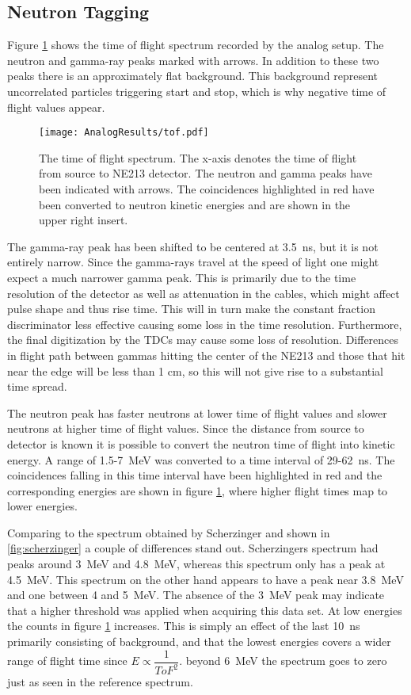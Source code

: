 \documentclass[main.tex]{subfiles}
\begin{document}
\subsection{Neutron Tagging}
Figure \ref{fig:tof_a} shows the time of flight spectrum recorded by the analog setup. The neutron and gamma-ray peaks marked with arrows. In addition to these two peaks there is an approximately flat background. This background represent uncorrelated particles triggering start and stop, which is why negative time of flight values appear.
\begin{figure}[ht]
    \centering
        \texttt{[image: AnalogResults/tof.pdf]}
        \caption[Time of flight spectrum, analog setup.]{The time of flight spectrum. The x-axis denotes the time of flight from source to NE213 detector. The neutron and gamma peaks have been indicated with arrows. The coincidences highlighted in red have been converted to neutron kinetic energies and are shown in the upper right insert.}
    \label{fig:tof_a}
\end{figure}

The gamma-ray peak has been shifted to be centered at \SI{3.5}{ns}, but it is not entirely narrow. Since the gamma-rays travel at the speed of light one might expect a much narrower gamma peak. This is primarily due to the time resolution of the detector as well as attenuation in the cables, which might affect pulse shape and thus rise time. This will in turn make the constant fraction discriminator less effective causing some loss in the time resolution. Furthermore, the final  digitization by the TDCs may cause some loss of resolution. Differences in flight path between gammas hitting the center of the NE213 and those that hit near the edge will be less than 1 cm, so this will not give rise to a substantial time spread. 

The neutron peak has faster neutrons at lower time of flight values and slower neutrons at higher time of flight values. Since the distance from source to detector is known it is possible to convert the neutron time of flight into kinetic energy. A range of 1.5-\SI{7}{\MeV} was converted to a time interval of 29-\SI{62}{\ns}. The coincidences falling in this time interval have been highlighted in red and the corresponding energies are shown in figure \ref{fig:tof_a}, where higher flight times map to lower energies.

Comparing to the spectrum obtained by Scherzinger\cite{ScherzingerPhd} and shown in \ref{fig:scherzinger} a couple of differences stand out. Scherzingers spectrum had peaks around \SI{3}{\MeV} and \SI{4.8}{\MeV}, whereas this spectrum only has a peak at \SI{4.5}{\MeV}. This spectrum on the other hand appears to have a peak near \SI{3.8}{\MeV} and one between 4 and \SI{5}{\MeV}. The absence of the \SI{3}{\MeV} peak may indicate that a higher threshold was applied when acquiring this data set. At low energies the counts in figure \ref{fig:tof_a} increases. This is simply an effect of the last \SI{10}{\ns} primarily consisting of background, and that the lowest energies covers a wider range of flight time since $E\propto \dfrac{1}{ToF^2}$. beyond \SI{6}{\MeV} the spectrum goes to zero just as seen in the reference spectrum.
\end{document}
